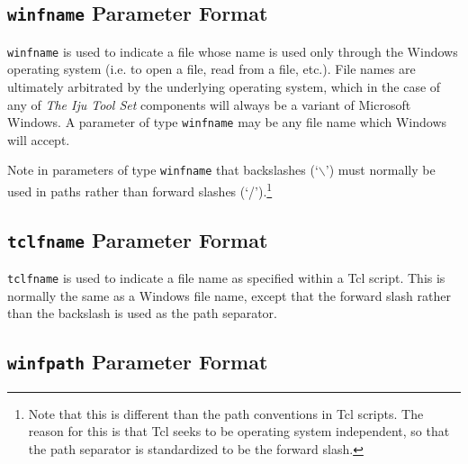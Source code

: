 \subsection{\texttt{winfname} Parameter Format}
\label{ctin0:sccl0:swnf0}

\texttt{winfname} is used to indicate a file whose name is used only through
the Windows operating system (i.e. to open a file, read from a file, etc.).  File
names are ultimately arbitrated by the underlying operating system, which
in the case of any of \emph{The Iju Tool Set} components will always be a variant
of Microsoft Windows.
A parameter of type \texttt{winfname} may be any file name which Windows
will accept.

Note in parameters of type \texttt{winfname} that backslashes (`$\backslash$')
must normally be used in paths rather than forward slashes 
(`/').\footnote{Note that this is different than the path conventions in Tcl
scripts.  The reason for this is that Tcl seeks to be operating system
independent, so that the path separator is standardized to be the 
forward slash.}


\subsection{\texttt{tclfname} Parameter Format}
\label{ctin0:sccl0:stcf0}

\texttt{tclfname} is used to indicate a file name as specified within a Tcl
script.  This is normally the same as a Windows file name, except that
the forward slash rather than the backslash is used as the path separator.


\subsection{\texttt{winfpath} Parameter Format}
\label{ctin0:sccl0:swfp0}

